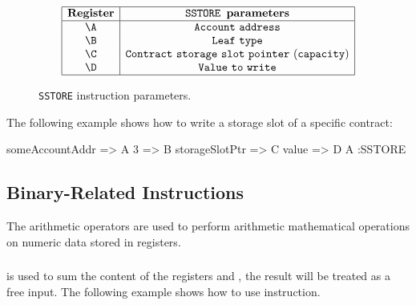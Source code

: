 \begin{figure}[h!]
  \renewcommand{\figurename}{Table}
  \[
  \begin{array}{|c|c|}
  \hline
  \mathbf{Register} &\texttt{SSTORE } \textbf{parameters} \\ \hline
  \A & \mathtt{Account~address} \\
  \B & \mathtt{Leaf~type} \\
  \C & \mathtt{Contract~storage~slot~pointer~(capacity)} \\
  \D & \mathtt{Value~to~write} \\
  \hline
  \end{array}
  \]
  \caption{\texttt{SSTORE} instruction parameters.}
  \label{tab:memory-first-example}
  \end{figure}
  
  The following example shows how to write a storage slot of a specific contract:

  \begin{zkasm}
    someAccountAddr => A          
    3 => B      
    storageSlotPtr => C          
    value => D         
    A               :SSTORE
  \end{zkasm}





\subsection{Binary-Related Instructions}

The arithmetic operators are used to perform arithmetic mathematical operations on numeric data stored in registers.

\subsubsection{\ADD}

\ADD is used to sum the content of the registers \A and \B, the result will be treated as a free input. The following example shows how to use \ADD instruction.


\subsubsection{\SUB}

